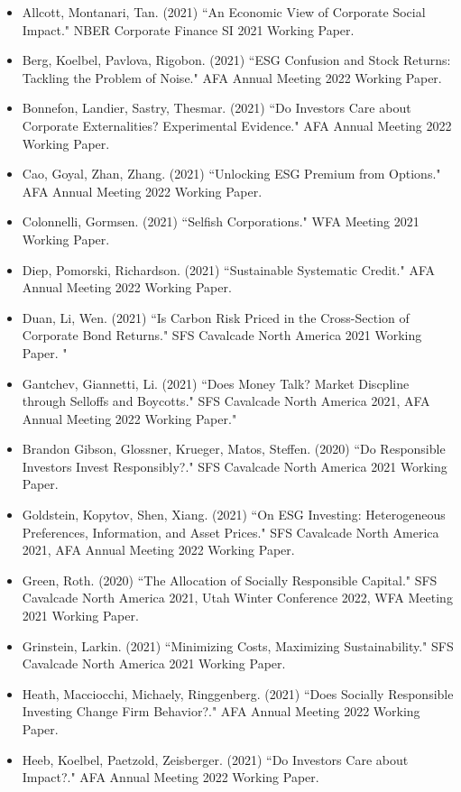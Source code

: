 \documentclass{article}
\begin{document}
\begin{itemize}
\item Allcott, Montanari, Tan. (2021) ``An Economic View of Corporate Social Impact." NBER Corporate Finance SI 2021 Working Paper.
\item Berg, Koelbel, Pavlova, Rigobon. (2021) ``ESG Confusion and Stock Returns: Tackling the Problem of Noise." AFA Annual Meeting 2022 Working Paper.
\item Bonnefon, Landier, Sastry, Thesmar. (2021) ``Do Investors Care about Corporate Externalities? Experimental Evidence." AFA Annual Meeting 2022 Working Paper.
\item Cao, Goyal, Zhan, Zhang. (2021) ``Unlocking ESG Premium from Options." AFA Annual Meeting 2022 Working Paper.
\item Colonnelli, Gormsen. (2021) ``Selfish Corporations." WFA Meeting 2021 Working Paper.
\item Diep, Pomorski, Richardson. (2021) ``Sustainable Systematic Credit." AFA Annual Meeting 2022 Working Paper.
\item Duan, Li, Wen. (2021) ``Is Carbon Risk Priced in the Cross-Section of Corporate Bond Returns." SFS Cavalcade North America 2021 Working Paper.
"\item Gantchev, Giannetti, Li. (2021) ``Does Money Talk? Market Discpline through Selloffs and Boycotts." SFS Cavalcade North America 2021, AFA Annual Meeting 2022 Working Paper."
\item Brandon Gibson, Glossner, Krueger, Matos, Steffen. (2020) ``Do Responsible Investors Invest Responsibly?." SFS Cavalcade North America 2021 Working Paper.
\item Goldstein, Kopytov, Shen, Xiang. (2021) ``On ESG Investing: Heterogeneous Preferences, Information, and Asset Prices." SFS Cavalcade North America 2021, AFA Annual Meeting 2022 Working Paper.
\item Green, Roth. (2020) ``The Allocation of Socially Responsible Capital." SFS Cavalcade North America 2021, Utah Winter Conference 2022, WFA Meeting 2021 Working Paper.
\item Grinstein, Larkin. (2021) ``Minimizing Costs, Maximizing Sustainability." SFS Cavalcade North America 2021 Working Paper.
\item Heath, Macciocchi, Michaely, Ringgenberg. (2021) ``Does Socially Responsible Investing Change Firm Behavior?." AFA Annual Meeting 2022 Working Paper.
\item Heeb, Koelbel, Paetzold, Zeisberger. (2021) ``Do Investors Care about Impact?." AFA Annual Meeting 2022 Working Paper.

\end{itemize}
\end{document}
